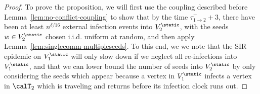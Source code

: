 \documentclass[11pt]{article}
\begin{document}
\begin{proof}  

To prove the proposition, we will first use the coupling described before Lemma~\ref{lem:no-conflict-coupling} to show that by the time $\tau_{1\to2}^++3$, there have been at least $n^{\delta/16}$ external infection events into $V_2^\static$, with the  seeds $w\in V_2^\static$ chosen i.i.d. uniform at random, and then apply Lemma~\ref{lem:singlecomm-multipleseeds}.
To this end, we we note that the SIR epidemic on $V^\static_1$ will only slow down if we neglect all re-infections into $V_1^\static$, and that we can lower bound the number of seeds into $V_2^\static$ by only considering the seeds  which appear because a vertex in $V_1^\static$ infects a vertex in $\calT_2$ which is traveling and returns before its infection clock runs out. 


\end{proof}
\end{document}
